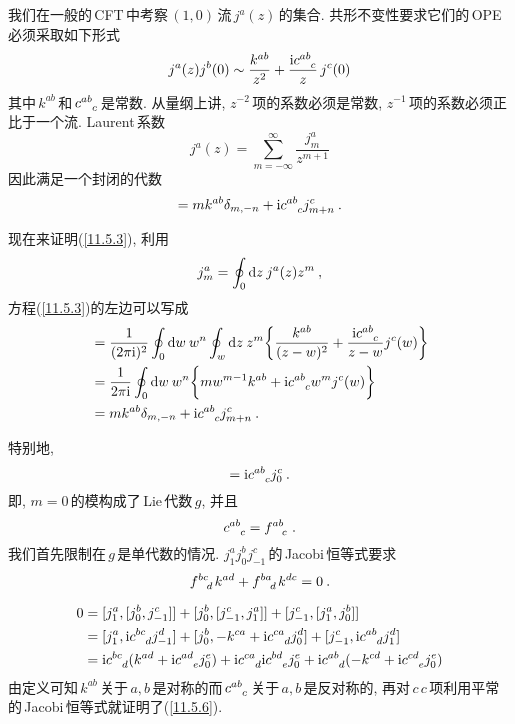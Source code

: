 我们在一般的\,CFT\,中考察$\,(1,0)\,$流$\,j^{a}(z)\,$的集合. 共形不变性要求它们的\,OPE\,必须采取如下形式
\begin{equation}
    j^{a}(z)j^{b}(0) \sim \frac{k^{ab}}{z^{2}} + \frac{\mi c\indices{^a^b_c}}{z}\,j^{c}(0) \label{11.5.1}
\end{equation}
其中$\,k^{ab}\,$和$\,c\indices{^a^b_c}\,$是常数. 从量纲上讲, $z^{-2}\,$项的系数必须是常数, $z^{-1}\,$项的系数必须正比于一个流. Laurent\,系数
\begin{equation}
    j^{a}(z) = \sum_{m=-\infty}^{\infty} \frac{j_{m}^{a}}{z^{m+1}} \label{11.5.2}
\end{equation}
因此满足一个封闭的代数
\begin{equation}
    [j_{m}^{a},j_{n}^{b}]=mk^{ab}\delta_{m,-n}+\mi c\indices{^a^b_c}j^{c}_{m+n} \:. \label{11.5.3}
\end{equation}
\begin{tcolorbox}
现在来证明(\ref{11.5.3}), 利用
\[
j_{m}^{a} = \oint_{0}\mathrm{d} z\: j^{a}(z)z^{m} \:,
\]
方程(\ref{11.5.3})的左边可以写成
\begin{align*}
     [j_{m}^{a},j_{n}^{b}] &= \frac{1}{(2\pi\mi)^{2}}\oint_{0} \dif w\: w^{n} \oint_{w}\dif z\: z^{m}
     \biggl\{\frac{k^{ab}}{(z-w)^{2}}+\frac{\mi c\indices{^a^b_c}}{z-w}j^{c}(w) \biggr\} \\
     &=\frac{1}{2\pi\mi} \oint_{0} \dif w\: w^{n} \biggl\{mw^{m-1}k^{ab}+ \mi c\indices{^a^b_c}w^{m}j^{c}(w) \biggr\}\\
     &=mk^{ab}\delta_{m,-n}+\mi c\indices{^a^b_c}j^{c}_{m+n} \:.
\end{align*}
\end{tcolorbox}
\noindent 特别地,
\begin{equation}
    [j^{a}_{0},j^{b}_{0}] = \mi c\indices{^a^b_c}j_{0}^{c} \:. \label{11.5.4}
\end{equation}
即, $m=0\,$的模构成了\,Lie\,代数$\,g$, 并且
\begin{equation}
    c\indices{^a^b_c}=f\indices{^a^b_c} \:. \label{11.5.5}
\end{equation}
我们首先限制在$\,g\,$是单代数的情况. $j_{1}^{a}j_{0}^{b}j_{-1}^{c}\,$的\,Jacobi\,恒等式要求
\begin{equation}
    f\indices{^b^c_d}k^{ad}+f\indices{^b^a_d}k^{dc} = 0 \:. \label{11.5.6}
\end{equation}
\begin{tcolorbox}
\begin{align*}
    0 &= [j_{1}^{a},[j_{0}^{b},j_{-1}^{c}]]+[j_{0}^{b},[j_{-1}^{c},j_{1}^{a}]]
    +[j_{-1}^{c},[j_{1}^{a},j_{0}^{b}]] \\
    &= [j_{1}^{a},\mi c\indices{^b^c_d}j^{d}_{-1}]+ [j_{0}^{b},-k^{ca}+\mi c\indices{^c^a_d}j_{0}^{d}]
    +[j_{-1}^{c},\mi c\indices{^a^b_d}j_{1}^{d}]\\
    &=\mi c\indices{^b^c_d}(k^{ad}+\mi c\indices{^a^d_e}j^{e}_{0})+\mi c\indices{^c^a_d}\mi c\indices{^b^d_e}j^{e}_{0}
    +\mi c\indices{^a^b_d}(-k^{cd}+\mi c\indices{^c^d_e}j^{e}_{0})
\end{align*}
由定义可知$\,k^{ab}\,$关于$\,a,b\,$是对称的而$\,c\indices{^a^b_c}\,$关于$\,a,b\,$是反对称的, 再对$\,c\,c\,$项利用平常的\,Jacobi\,恒等式就证明了(\ref{11.5.6}).
\end{tcolorbox}
